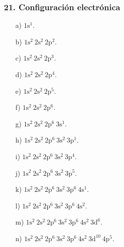 \subsubsection*{21. Configuración electrónica}
\begin{enumerate}
    \item[a)] $1\mathrm{s}^1$.
    \item[b)] $1\mathrm{s}^2\ 2\mathrm{s}^2\ 2\mathrm{p}^2$.
    \item[c)] $1\mathrm{s}^2\ 2\mathrm{s}^2\ 2\mathrm{p}^3$.
    \item[d)] $1\mathrm{s}^2\ 2\mathrm{s}^2\ 2\mathrm{p}^4$.
    \item[e)] $1\mathrm{s}^2\ 2\mathrm{s}^2\ 2\mathrm{p}^5$.
    \item[f)] $1\mathrm{s}^2\ 2\mathrm{s}^2\ 2\mathrm{p}^6$.
    \item[g)] $1\mathrm{s}^2\ 2\mathrm{s}^2\ 2\mathrm{p}^6\ 3\mathrm{s}^1$.
    \item[h)] $1\mathrm{s}^2\ 2\mathrm{s}^2\ 2\mathrm{p}^6\
    3\mathrm{s}^2\ 3\mathrm{p}^1$.
    \item[i)] $1\mathrm{s}^2\ 2\mathrm{s}^2\ 2\mathrm{p}^6\
    3\mathrm{s}^2\ 3\mathrm{p}^4$.
    \item[j)] $1\mathrm{s}^2\ 2\mathrm{s}^2\ 2\mathrm{p}^6\
    3\mathrm{s}^2\ 3\mathrm{p}^5$.
    \item[k)] $1\mathrm{s}^2\ 2\mathrm{s}^2\ 2\mathrm{p}^6\
    3\mathrm{s}^2\ 3\mathrm{p}^6\ 4\mathrm{s}^1$.
    \item[l)] $1\mathrm{s}^2\ 2\mathrm{s}^2\ 2\mathrm{p}^6\
    3\mathrm{s}^2\ 3\mathrm{p}^6\ 4\mathrm{s}^2$.
    \item[m)] $1\mathrm{s}^2\ 2\mathrm{s}^2\ 2\mathrm{p}^6\
    3\mathrm{s}^2\ 3\mathrm{p}^6\ 4\mathrm{s}^2\ 3\mathrm{d}^6$.
    \item[n)] $1\mathrm{s}^2\ 2\mathrm{s}^2\ 2\mathrm{p}^6\
    3\mathrm{s}^2\ 3\mathrm{p}^6\ 4\mathrm{s}^2\
    3\mathrm{d}^{10}\ 4\mathrm{p}^5$.
\end{enumerate}

